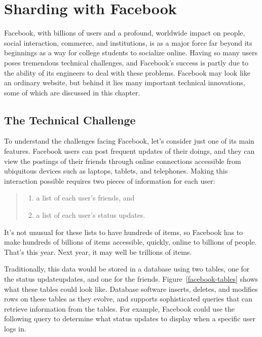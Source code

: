 \chapter{Sharding with Facebook}

Facebook,
with billions of users and a profound, worldwide impact
on people, social interaction, commerce, and institutions,
is as a major force far beyond its beginnings
as a way for college students to socialize online.
Having so many users poses tremendous technical challenges,
and Facebook's success is partly due to
the ability of its engineers to deal with these problems.
Facebook may look like an ordinary website,
but behind it lies many important technical innovations,
some of which are discussed in this chapter.

\section{The Technical Challenge}

To understand the challenges facing Facebook,
let's consider just one of its main features.
Facebook users can post frequent updates of their doings,
and they can view the postings of their friends through online connections
accessible from ubiquitous devices such as laptops, tablets, and telephones.
Making this interaction possible requires two pieces of information for each user:
\begin{quote}
\begin{enumerate}
	\item a list of each user's friends, and
	\item a list of each user's status updates.
\end{enumerate}
\end{quote}
It's not unusual for these lists to have hundreds of items,
so Facebook has to make hundreds of billions of items
accessible, quickly, online to billions of people.
That's this year. Next year, it may well be trillions of items.

Traditionally, this data would be stored in a database
using two tables, one for the status updateupdates,
and one for the friends.  Figure~\ref{facebook-tables}
shows what these tables could look like.
Database software inserts, deletes, and modifies
rows on these tables as they evolve,
and supports sophisticated queries that can
retrieve information from the tables.
For example, Facebook could use the following query to determine
what status updates to display when a specific user logs in.

